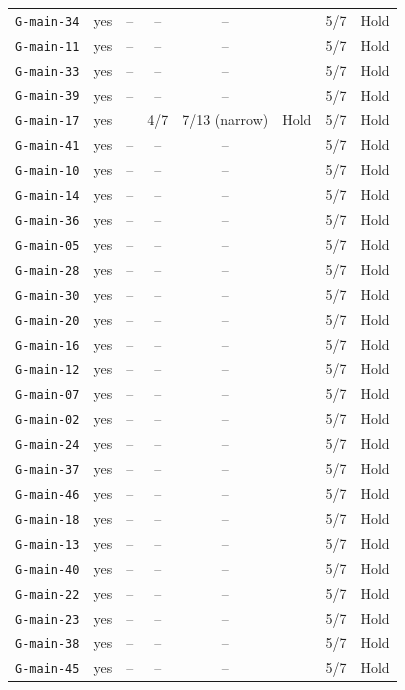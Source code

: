 \begin{table}[pos=t]
\begin{tabularx}{\textwidth}{@{}lccccccY@{}}
\texttt{G-main-34} & yes & -- & -- & -- &  & 5/7 & Hold \\
\texttt{G-main-11} & yes & -- & -- & -- &  & 5/7 & Hold \\
\texttt{G-main-33} & yes & -- & -- & -- &  & 5/7 & Hold \\
\texttt{G-main-39} & yes & -- & -- & -- &  & 5/7 & Hold \\
\texttt{G-main-17} & yes & \Pass{} & 4/7 & 7/13 (narrow) & Hold & 5/7 & Hold \\
\texttt{G-main-41} & yes & -- & -- & -- &  & 5/7 & Hold \\
\texttt{G-main-10} & yes & -- & -- & -- &  & 5/7 & Hold \\
\texttt{G-main-14} & yes & -- & -- & -- &  & 5/7 & Hold \\
\texttt{G-main-36} & yes & -- & -- & -- &  & 5/7 & Hold \\
\texttt{G-main-05} & yes & -- & -- & -- &  & 5/7 & Hold \\
\texttt{G-main-28} & yes & -- & -- & -- &  & 5/7 & Hold \\
\texttt{G-main-30} & yes & -- & -- & -- &  & 5/7 & Hold \\
\texttt{G-main-20} & yes & -- & -- & -- &  & 5/7 & Hold \\
\texttt{G-main-16} & yes & -- & -- & -- &  & 5/7 & Hold \\
\texttt{G-main-12} & yes & -- & -- & -- &  & 5/7 & Hold \\
\texttt{G-main-07} & yes & -- & -- & -- &  & 5/7 & Hold \\
\texttt{G-main-02} & yes & -- & -- & -- &  & 5/7 & Hold \\
\texttt{G-main-24} & yes & -- & -- & -- &  & 5/7 & Hold \\
\texttt{G-main-37} & yes & -- & -- & -- &  & 5/7 & Hold \\
\texttt{G-main-46} & yes & -- & -- & -- &  & 5/7 & Hold \\
\texttt{G-main-18} & yes & -- & -- & -- &  & 5/7 & Hold \\
\texttt{G-main-13} & yes & -- & -- & -- &  & 5/7 & Hold \\
\texttt{G-main-40} & yes & -- & -- & -- &  & 5/7 & Hold \\
\texttt{G-main-22} & yes & -- & -- & -- &  & 5/7 & Hold \\
\texttt{G-main-23} & yes & -- & -- & -- &  & 5/7 & Hold \\
\texttt{G-main-38} & yes & -- & -- & -- &  & 5/7 & Hold \\
\texttt{G-main-45} & yes & -- & -- & -- &  & 5/7 & Hold \\

\end{tabularx}
\end{table}
